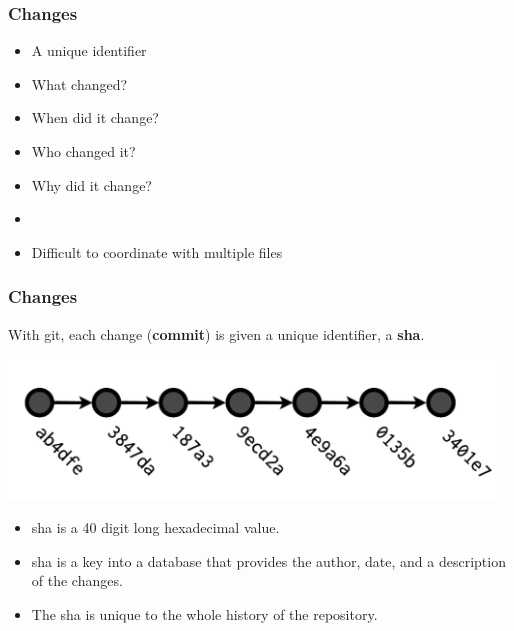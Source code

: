   \begin{frame}[t]
    \frametitle{Changes}
    \begin{itemize}
      \item A unique identifier
      \item What changed?
      \item When did it change?
      \item Who changed it?
      \item Why did it change?
      \item[]
      \item Difficult to coordinate with multiple files
    \end{itemize}
  \end{frame}

  \begin{frame}[t]
    \frametitle{Changes}
    With git, each change ({\bf commit}) is given a unique identifier, a {\bf
    sha}.
    \begin{center}
      \includegraphics[width=0.98\textwidth]{./images/from-wickham-02} 
    \end{center} 

    \begin{itemize} 
      \item sha is a 40 digit long hexadecimal value.
      \item sha is a key into a database that provides the author, date, and a
        description of the changes.
      \item The sha is unique to the whole history of the repository.
    \end{itemize} 
  \end{frame}

